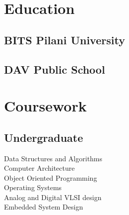 \documentclass[]{Resume}
\begin{document}
%
%
\lastupdated

%
%

%
%

\begin{minipage}[t]{0.33\textwidth} 


\section{Education} 
\vspace{\topsep}
\subsection{BITS Pilani University}
\sectionsep

\subsection{DAV Public School}
\vspace{\topsep}
\sectionsep


\section{Coursework}
\vspace{\topsep}
\subsection{Undergraduate}
Data Structures and Algorithms \\
Computer Architecture\\
Object Oriented Programming\\
Operating Systems \\
Analog and Digital VLSI design\\
Embedded System Design\\


\end{minipage}
\end{document}
